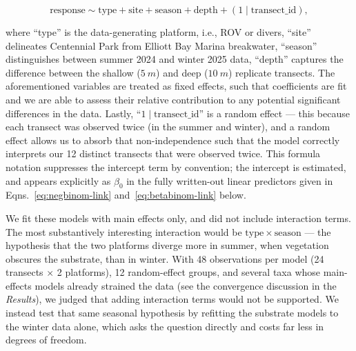 \documentclass[11pt]{article}
\begin{document}
\begin{equation}
\mathrm{response}
\sim
\mathrm{type} + \mathrm{site} + \mathrm{season} + \mathrm{depth}
+ (1 \mid \mathrm{transect\_id}),
\label{eq:model}
\end{equation}

\noindent
where ``type'' is the data-generating platform, i.e., ROV or divers,
``site'' delineates Centennial Park from Elliott Bay Marina breakwater,
``season'' distinguishes between summer 2024 and winter 2025 data,
``depth'' captures the difference between the shallow ($5~m$) and deep ($10~m$)
replicate transects.
The aforementioned variables are treated as fixed effects, such that
coefficients are fit and we are able to assess their relative contribution to
any potential significant differences in the data.
Lastly, ``$1 \mid \mathrm{transect\_id}$'' is a random effect --- this because
each transect was observed twice (in the summer and winter), and a random
effect allows us to absorb that non-independence such that the model correctly
interprets our 12 distinct transects that were observed twice.
This formula notation suppresses the intercept term by convention; the
intercept is estimated, and appears explicitly as $\beta_0$ in the fully
written-out linear predictors given in Eqns.~\ref{eq:negbinom-link}
and~\ref{eq:betabinom-link} below.

We fit these models with main effects only, and did not include interaction
terms.
The most substantively interesting interaction would be
$\mathrm{type} \times \mathrm{season}$ --- the hypothesis that the two
platforms diverge more in summer, when vegetation obscures the substrate,
than in winter.
With 48 observations per model (24 transects $\times$ 2 platforms), 12
random-effect groups, and several taxa whose main-effects models already
strained the data (see the convergence discussion in the \textit{Results}),
we judged that adding interaction terms would not be supported.
We instead test that same seasonal hypothesis by refitting the substrate
models to the winter data alone, which asks the question directly and costs
far less in degrees of freedom.
\end{document}
